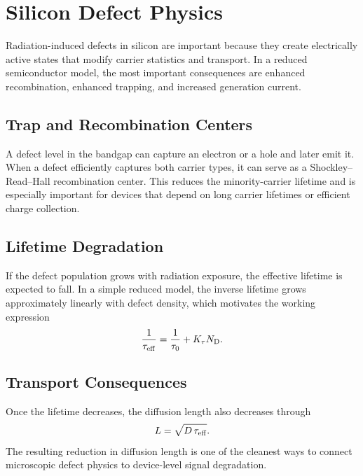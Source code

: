 \documentclass[../../project_master.tex]{subfiles}
\begin{document}
\section{Silicon Defect Physics}
Radiation-induced defects in silicon are important because they create electrically active states that modify carrier statistics and transport. In a reduced semiconductor model, the most important consequences are enhanced recombination, enhanced trapping, and increased generation current.

\subsection{Trap and Recombination Centers}
A defect level in the bandgap can capture an electron or a hole and later emit it. When a defect efficiently captures both carrier types, it can serve as a Shockley--Read--Hall recombination center. This reduces the minority-carrier lifetime and is especially important for devices that depend on long carrier lifetimes or efficient charge collection.

\subsection{Lifetime Degradation}
If the defect population grows with radiation exposure, the effective lifetime is expected to fall. In a simple reduced model, the inverse lifetime grows approximately linearly with defect density, which motivates the working expression
\begin{equation}
\frac{1}{\tau_\mathrm{eff}} = \frac{1}{\tau_0} + K_\tau N_\mathrm{D}.
\end{equation}

\subsection{Transport Consequences}
Once the lifetime decreases, the diffusion length also decreases through
\begin{equation}
L = \sqrt{D\,\tau_\mathrm{eff}}.
\end{equation}
The resulting reduction in diffusion length is one of the cleanest ways to connect microscopic defect physics to device-level signal degradation.
\end{document}
